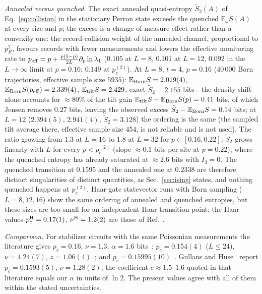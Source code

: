 \documentclass[aps,prx,reprint,superscriptaddress,nobibnotes,longbibliography]{revtex4-2}
\theoremstyle{remark}
\newcommand{\E}{\mathbb E}
\begin{document}
\emph{Annealed versus quenched.}  The exact annealed quasi-entropy $\tilde S_2(A)$ of Eq.~\eqref{eq:collision} in the stationary Perron state exceeds the quenched $\E_\omega S(A)$ at every size and $p$; the excess is a change-of-measure effect rather than a convexity one: the record-collision weight of the annealed channel, proportional to $p_R^2$, favours records with fewer measurements and lowers the effective monitoring rate to $p_{\rm eff}=p+\frac{p(1-p)}{2L}\partial_p\ln\lambda_1$ ($0.105$ at $L=8$, $0.101$ at $L=12$, $0.092$ in the $L\to\infty$ limit at $p=0.16$; $0.149$ at $p_c^{(2)}$).  At $L=8$, $t=4$, $p=0.16$ ($40\,000$ Born trajectories, effective sample size $5935$): $\E_{\rm Born}S=2.019(4)$, $\E_{\rm Born}S(p_{\rm eff})=2.339(4)$, $\E_{\rm tilt}S=2.429$, exact $\tilde S_2=2.155$ bits---the density shift alone accounts for ${\approx}80\%$ of the tilt gain $\E_{\rm tilt}S-\E_{\rm Born}S(p)=0.41$ bits, of which Jensen removes $0.27$ bits, leaving the observed excess $\tilde S_2-\E_{\rm Born}S=0.14$ bits; at $L=12$ ($2.394(5)$, $2.941(4)$, $\tilde S_2=3.128$) the ordering is the same (the sampled tilt average there, effective sample size $454$, is not reliable and is not used).  The ratio growing from $1.3$ at $L=16$ to $1.8$ at $L=32$ for $p\in[0.16,0.22]$; $\tilde S_2$ grows linearly with $L$ for every $p<p_c^{(2)}$ (slope $\approx0.1$ bits per site at $p=0.22$), where the quenched entropy has already saturated at $\approx2.6$ bits with $I_3=0$.  The quenched transition at $0.1595$ and the annealed one at $0.2338$ are therefore distinct singularities of distinct quantities, as Sec.~\ref{sec:ising} states, and nothing quenched happens at $p_c^{(2)}$.  Haar-gate statevector runs with Born sampling ($L=8,12,16$) show the same ordering of annealed and quenched entropies, but these sizes are too small for an independent Haar transition point; the Haar values $p_c^{\rm H}=0.17(1)$, $\nu^{\rm H}=1.2(2)$ are those of Ref.~\cite{Zabalo2020}.

\emph{Comparison.}  For stabilizer circuits with the same Poissonian measurements the literature gives $p_c=0.16$, $\nu=1.3$, $\alpha=1.6$ bits~\cite{Li2019}; $p_c=0.154(4)$ ($L\le24$), $\nu=1.24(7)$, $z=1.06(4)$~\cite{Zabalo2020}; and $p_c=0.15995(10)$~\cite{Sierant2022}.  Gullans and Huse~\cite{Gullans2020} report $p_c=0.1593(5)$, $\nu=1.28(2)$; the coefficient $\tilde c\approx1.5$--$1.6$ quoted in that literature equals our $\alpha$ in units of $\ln2$.  The present values agree with all of them within the stated uncertainties.
\end{document}
